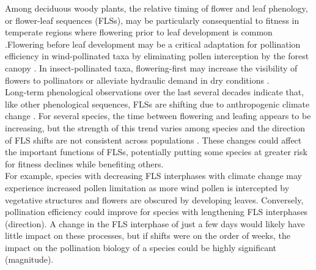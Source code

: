 \documentclass[11pt]{article}
\begin{document}
\noindent Among deciduous woody plants, the relative timing of flower and leaf phenology, or flower-leaf sequences (FLSs), may be particularly consequential to fitness in temperate regions where flowering prior to leaf development is common \citep{Rathcke_1985,Gougherty2018}.Flowering before leaf development may be a critical adaptation for pollination efficiency in wind-pollinated taxa by eliminating pollen interception by the forest canopy \citep{Whitehead1969}. In insect-pollinated taxa, flowering-first may increase the visibility of flowers to pollinators \citep{Janzen1967,Savage2019} or alleviate hydraulic demand in dry conditions \citep{Gougherty2018, Franklin2016}.\\ %

\noindent Long-term phenological observations over the last several decades indicate that, like other phenological sequences, FLSs are shifting due to anthropogenic climate change \citep{Buonaiuto2020}. For several species, the time between flowering and leafing appears to be increasing, but the strength of this trend varies among species and the direction of FLS shifts are not consistent across populations \citep{Buonaiuto2020}. These changes could affect the important functions of FLSs, potentially putting some species at greater risk for fitness declines while benefiting others.\\ %

\noindent For example, species with decreasing FLS interphases with climate change may experience increased pollen limitation as more wind pollen is intercepted by vegetative structures and flowers are obscured by developing leaves. Conversely, pollination efficiency could improve for species with lengthening FLS interphases (direction). A change in the FLS interphase of just a few days would likely have little impact on these processes, but if shifts were on the order of weeks, the impact on the pollination biology of a species could be highly significant (magnitude).\\
\end{document}
